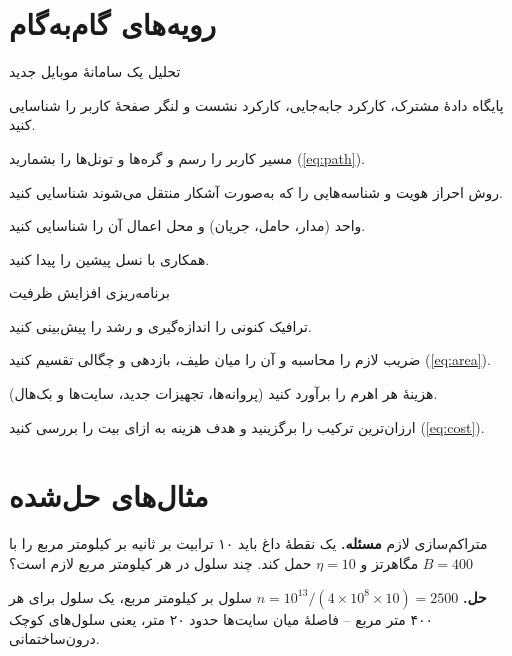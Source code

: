 \documentclass[11pt,a4paper]{article}
\begin{document}
\section{رویه‌های گام‌به‌گام}

\begin{procedurebox}{تحلیل یک سامانهٔ موبایل جدید}\label{proc:analyse}
\begin{steps}
  \item پایگاه دادهٔ مشترک، کارکرد جابه‌جایی، کارکرد نشست و لنگر صفحهٔ کاربر را شناسایی کنید.
  \item مسیر کاربر را رسم و گره‌ها و تونل‌ها را بشمارید (\cref{eq:path}).
  \item روش احراز هویت و شناسه‌هایی را که به‌صورت آشکار منتقل می‌شوند شناسایی کنید.
  \item واحد  (مدار، حامل، جریان) و محل اعمال آن را شناسایی کنید.
  \item همکاری با نسل پیشین را پیدا کنید.
\end{steps}
\end{procedurebox}

\begin{procedurebox}{برنامه‌ریزی افزایش ظرفیت}\label{proc:cap}
\begin{steps}
  \item ترافیک کنونی را اندازه‌گیری و رشد را پیش‌بینی کنید.
  \item ضریب لازم را محاسبه و آن را میان طیف، بازدهی و چگالی تقسیم کنید (\cref{eq:area}).
  \item هزینهٔ هر اهرم را برآورد کنید (پروانه‌ها، تجهیزات جدید، سایت‌ها و بک‌هال).
  \item ارزان‌ترین ترکیب را برگزینید و هدف هزینه به ازای بیت را بررسی کنید (\cref{eq:cost}).
\end{steps}
\end{procedurebox}

\section{مثال‌های حل‌شده}

\begin{examplebox}{متراکم‌سازی لازم}\label{ex:dens}
\textbf{مسئله.} یک نقطهٔ داغ باید ۱۰ ترابیت بر ثانیه بر کیلومتر مربع را با $B = 400$ مگاهرتز و $\eta = 10$ حمل کند. چند سلول در هر کیلومتر مربع لازم است؟

\textbf{حل.} $n = 10^{13}/(4\times10^{8}\times10) = 2500$ سلول بر کیلومتر مربع، یک سلول برای هر ۴۰۰ متر مربع -- فاصلهٔ میان سایت‌ها حدود ۲۰ متر، یعنی سلول‌های
کوچک درون‌ساختمانی.
\end{examplebox}
\end{document}
